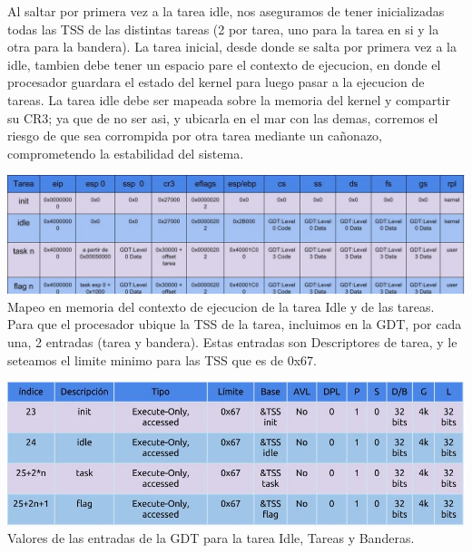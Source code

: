Al saltar por primera vez a la tarea idle, nos aseguramos de tener inicializadas todas las TSS de las distintas tareas (2 por tarea, uno para la tarea en si y la otra para la bandera). La tarea inicial, desde donde se salta por primera vez a la idle, tambien debe tener un espacio pare el contexto de ejecucion, en donde el procesador guardara el estado del kernel para luego pasar a la ejecucion de tareas. La tarea idle debe ser mapeada sobre la memoria del kernel y compartir su CR3; ya que de no ser asi, y ubicarla en el mar con las demas, corremos el riesgo de que sea corrompida por otra tarea mediante un cañonazo, comprometendo la estabilidad del sistema.

\includegraphics[scale=0.4]{diagramas/descriptoresDeTareas.jpg}
Mapeo en memoria del contexto de ejecucion de la tarea Idle y de las tareas.\\


Para que el procesador ubique la TSS de la tarea, incluimos en la GDT, por cada una, 2 entradas (tarea y bandera). Estas entradas son Descriptores de tarea, y le seteamos el limite minimo para las TSS que es de 0x67.

\includegraphics[scale=0.4]{diagramas/entradasGDTParaTareas.jpg}
Valores de las entradas de la GDT para la tarea Idle, Tareas y Banderas.\\




